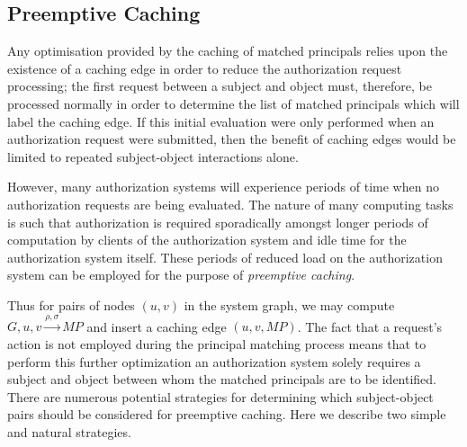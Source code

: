 \documentclass{article}
\renewcommand{\mp}{\mathit{MP}}
\begin{document}
\subsection{Preemptive Caching}\label{sec:caching:preemptive}
Any optimisation provided by the caching of matched principals relies upon the existence of a caching edge in order to reduce the authorization request processing; the first request between a subject and object must, therefore, be processed normally in order to determine the list of matched principals which will label the caching edge.
If this initial evaluation were only performed when an authorization request were submitted, then the benefit of caching edges would be limited to repeated subject-object interactions alone.

However, many authorization systems will experience periods of time when no authorization requests are being evaluated.
The nature of many computing tasks is such that authorization is required sporadically amongst longer periods of computation by clients of the authorization system and idle time for the authorization system itself.
These periods of reduced load on the authorization system can be employed for the purpose of \emph{preemptive caching}.

Thus for pairs of nodes $(u,v)$ in the system graph, we may compute $G,u,v \xrightarrow{\rho,\sigma} \mp$ and insert a caching edge $(u,v,\mp)$.
The fact that a request's action is not employed during the principal matching process means that to perform this further optimization an authorization system solely requires a subject and object between whom the matched principals are to be identified.
There are numerous potential strategies for determining which subject-object pairs should be considered for preemptive caching.
Here we describe two simple and natural strategies.
\end{document}
